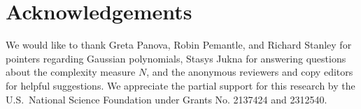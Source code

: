 \section*{Acknowledgements}

We would like to thank Greta Panova, Robin Pemantle, and Richard Stanley for pointers regarding Gaussian polynomials, Stasys Jukna for answering questions about the complexity measure $N$, and the anonymous reviewers and copy editors for helpful suggestions. 
%
We appreciate the partial support for this research by the U.S.\ National Science Foundation under Grants No. 2137424 and 2312540. 
%
%

%
